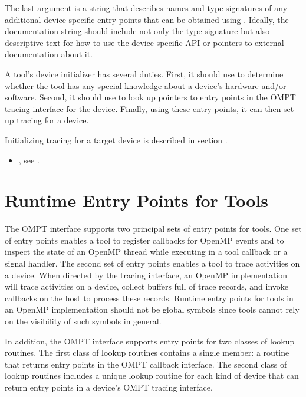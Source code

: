 The last argument is a string that describes names and type signatures
of any additional device-specific entry points that can be obtained
using . Ideally, the documentation string should include
not only the type signature but also descriptive text for how to use
the device-specific API or pointers to external documentation about
it.

\effect

A tool's device initializer has several duties.  First, it should use
 to determine whether the tool has any special knowledge
about a device's hardware and/or software.  Second, it should use
 to look up pointers to entry points in the OMPT tracing
interface for the device.  Finally, using these entry points, it can
then set up tracing for a device.

Initializing tracing for a target device is described in section
. 

\crossreferences
\begin{itemize}
\item {}, see
  .
\end{itemize}

\section{Runtime Entry Points for Tools}
\label{sec:entry-points}

The OMPT interface supports two principal sets of entry points for tools. One
set of entry points enables a tool to register callbacks for OpenMP
events and to inspect the state of an OpenMP thread while
executing in a tool callback or a signal handler. The second set of entry points enables a
tool to trace activities on a device. When directed by the tracing
interface, an OpenMP implementation will trace activities on a device, collect
buffers full of trace records, and invoke callbacks on the host to
process these records. 
Runtime entry points for tools in an OpenMP implementation
should not be global symbols since tools cannot rely on the visibility
of such symbols in general.

In addition, the OMPT interface supports
entry points for two classes of lookup routines. The first
class of lookup routines contains a single member: a
routine that returns entry points in the OMPT callback interface. 
The second class of lookup routines includes 
a unique lookup routine for each kind of
device that can return entry points in a device's OMPT tracing interface.

